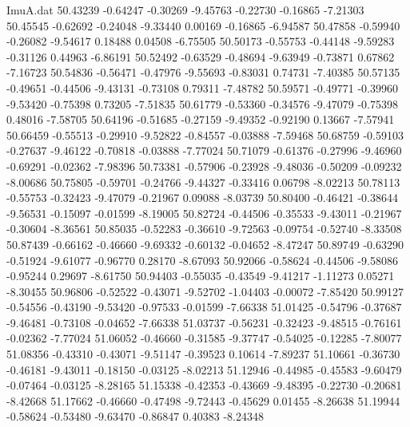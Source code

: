 \begin{filecontents}{ImuA.dat}
  50.43239   -0.64247   -0.30269   -9.45763   -0.22730   -0.16865   -7.21303
  50.45545   -0.62692   -0.24048   -9.33440    0.00169   -0.16865   -6.94587
  50.47858   -0.59940   -0.26082   -9.54617    0.18488    0.04508   -6.75505
  50.50173   -0.55753   -0.44148   -9.59283   -0.31126    0.44963   -6.86191
  50.52492   -0.63529   -0.48694   -9.63949   -0.73871    0.67862   -7.16723
  50.54836   -0.56471   -0.47976   -9.55693   -0.83031    0.74731   -7.40385
  50.57135   -0.49651   -0.44506   -9.43131   -0.73108    0.79311   -7.48782
  50.59571   -0.49771   -0.39960   -9.53420   -0.75398    0.73205   -7.51835
  50.61779   -0.53360   -0.34576   -9.47079   -0.75398    0.48016   -7.58705
  50.64196   -0.51685   -0.27159   -9.49352   -0.92190    0.13667   -7.57941
  50.66459   -0.55513   -0.29910   -9.52822   -0.84557   -0.03888   -7.59468
  50.68759   -0.59103   -0.27637   -9.46122   -0.70818   -0.03888   -7.77024
  50.71079   -0.61376   -0.27996   -9.46960   -0.69291   -0.02362   -7.98396
  50.73381   -0.57906   -0.23928   -9.48036   -0.50209   -0.09232   -8.00686
  50.75805   -0.59701   -0.24766   -9.44327   -0.33416    0.06798   -8.02213
  50.78113   -0.55753   -0.32423   -9.47079   -0.21967    0.09088   -8.03739
  50.80400   -0.46421   -0.38644   -9.56531   -0.15097   -0.01599   -8.19005
  50.82724   -0.44506   -0.35533   -9.43011   -0.21967   -0.30604   -8.36561
  50.85035   -0.52283   -0.36610   -9.72563   -0.09754   -0.52740   -8.33508
  50.87439   -0.66162   -0.46660   -9.69332   -0.60132   -0.04652   -8.47247
  50.89749   -0.63290   -0.51924   -9.61077   -0.96770    0.28170   -8.67093
  50.92066   -0.58624   -0.44506   -9.58086   -0.95244    0.29697   -8.61750
  50.94403   -0.55035   -0.43549   -9.41217   -1.11273    0.05271   -8.30455
  50.96806   -0.52522   -0.43071   -9.52702   -1.04403   -0.00072   -7.85420
  50.99127   -0.54556   -0.43190   -9.53420   -0.97533   -0.01599   -7.66338
  51.01425   -0.54796   -0.37687   -9.46481   -0.73108   -0.04652   -7.66338
  51.03737   -0.56231   -0.32423   -9.48515   -0.76161   -0.02362   -7.77024
  51.06052   -0.46660   -0.31585   -9.37747   -0.54025   -0.12285   -7.80077
  51.08356   -0.43310   -0.43071   -9.51147   -0.39523    0.10614   -7.89237
  51.10661   -0.36730   -0.46181   -9.43011   -0.18150   -0.03125   -8.02213
  51.12946   -0.44985   -0.45583   -9.60479   -0.07464   -0.03125   -8.28165
  51.15338   -0.42353   -0.43669   -9.48395   -0.22730   -0.20681   -8.42668
  51.17662   -0.46660   -0.47498   -9.72443   -0.45629    0.01455   -8.26638
  51.19944   -0.58624   -0.53480   -9.63470   -0.86847    0.40383   -8.24348

\end{filecontents}
